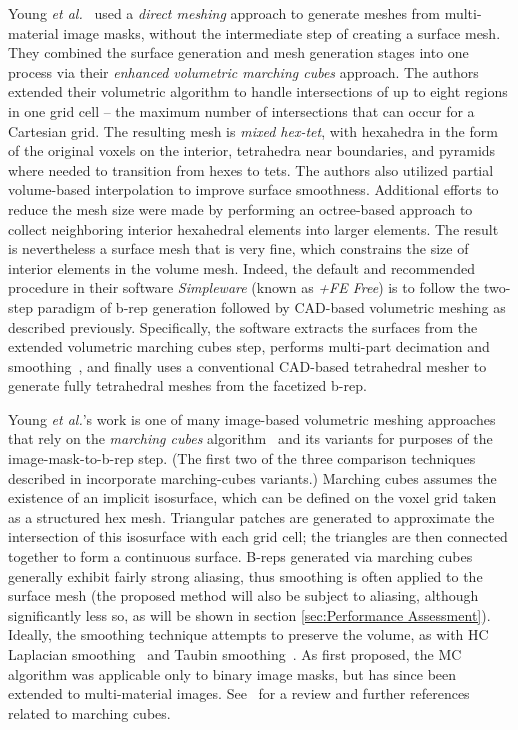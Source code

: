 Young \textit{et al.}~\cite{young_2008} used a \textit{direct meshing} approach to generate meshes from multi-material image masks, without the intermediate step of creating a surface mesh. They combined the surface generation and mesh generation stages into one process via their \textit{enhanced volumetric marching cubes} approach.  The authors extended their volumetric algorithm to handle intersections of up to eight regions in one grid cell -- the maximum number of intersections that can occur for a Cartesian grid.  The resulting mesh is \textit{mixed hex-tet}, with hexahedra in the form of the original voxels on the interior, tetrahedra near boundaries, and pyramids where needed to transition from hexes to tets. The authors also utilized partial volume-based interpolation to improve surface smoothness. Additional efforts to reduce the mesh size were made by performing an octree-based approach to collect neighboring interior hexahedral elements into larger elements.  The result is nevertheless a surface mesh that is very fine, which constrains the size of interior elements in the volume mesh.  Indeed, the default and recommended procedure in their software \textit{Simpleware} (known as \textit{+FE Free}) is to follow the two-step paradigm of b-rep generation followed by CAD-based volumetric meshing as described previously. Specifically, the software extracts the surfaces from the extended volumetric marching cubes step, performs multi-part decimation and smoothing~\cite{egst}, and finally uses a conventional CAD-based tetrahedral mesher to generate fully tetrahedral meshes from the facetized b-rep.

Young \textit{et al.}'s work is one of many image-based volumetric meshing approaches that rely on the \textit{marching cubes} algorithm~\cite{lorensen_1987} and its variants for purposes of the image-mask-to-b-rep step.  (The first two of the three comparison techniques described in  incorporate marching-cubes variants.)  Marching cubes assumes the existence of an implicit isosurface, which can be defined on the voxel grid taken as a structured hex mesh.  Triangular patches are generated to approximate the intersection of this isosurface with each grid cell; the triangles are then connected together to form a continuous surface. B-reps generated via marching cubes generally exhibit fairly strong aliasing, thus smoothing is often applied to the surface mesh (the proposed method will also be subject to aliasing, although significantly less so, as will be shown in section \ref{sec:Performance Assessment}). Ideally, the smoothing technique attempts to preserve the volume, as with HC Laplacian smoothing~\cite{vollmer_1999} and Taubin smoothing~\cite{taubin1995signal, taubin_1995}.  As first proposed, the MC algorithm was applicable only to binary image masks, but has since been extended to multi-material images.  See~\cite{newman2006} for a review and further references related to marching cubes.

